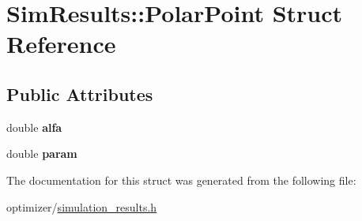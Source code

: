 \hypertarget{struct_sim_results_1_1_polar_point}{}\section{Sim\+Results\+:\+:Polar\+Point Struct Reference}
\label{struct_sim_results_1_1_polar_point}
\subsection*{Public Attributes}
\begin{DoxyCompactItemize}
\item 
\mbox{\label{struct_sim_results_1_1_polar_point_a42f2c76e058f9f40c22be5194e30ed9b}} 
double {\bfseries alfa}
\item 
\mbox{\label{struct_sim_results_1_1_polar_point_ad3fd235e4e540eb0d1ecb0cdade8054b}} 
double {\bfseries param}
\end{DoxyCompactItemize}


The documentation for this struct was generated from the following file\+:\begin{DoxyCompactItemize}
\item 
optimizer/\hyperlink{simulation__results_8h}{simulation\+\_\+results.\+h}\end{DoxyCompactItemize}
